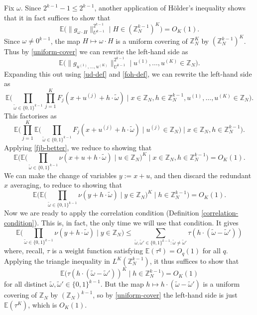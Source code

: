 \documentclass[12pt,a4paper,reqno]{amsart}
\numberwithin{equation}{section}
\theoremstyle{plain}
\theoremstyle{definition}
\renewcommand{\leq}{\leqslant}
\def\Z{{\mathbb Z}}
\def\E{{\mathbb E}}
\def\ni{\noindent}
\def\endproof{\hfill{\usebox{\proofbox}}}
\begin{document}
\ni Fix $\omega$.  Since $2^{k-1}-1 \leq 2^{k-1}$, another application of H\"older's inequality shows that it in fact suffices
to show that
$$\E\big( \| g_{\omega \cdot H} \|_{U^{k-1}}^{2^{k-1}} \; \big| \; H \in (\mathbb{Z}_N^{k-1})^K \big) = O_K(1).$$
Since $\omega \neq 0^{k-1}$, the map $H \mapsto \omega \cdot H$ is a uniform covering of $\mathbb{Z}_N^K$ 
by $(\mathbb{Z}_N^{k-1})^K$.  Thus by \eqref{uniform-cover} we can rewrite the left-hand side as
$$\E\big( \| g_{u^{(1)}, \ldots, u^{(K)}} \|_{U^{k-1}}^{2^{k-1}} \; \big| \; u^{(1)}, \ldots, u^{(K)} \in \mathbb{Z}_N \big).$$
Expanding this out using \eqref{ud-def} and \eqref{foh-def}, we can rewrite the left-hand side as
$$\E\bigg( \prod_{\tilde \omega \in \{0,1\}^{k-1}} \prod_{j=1}^K
F_j(x + u^{(j)} + h \cdot \tilde \omega) \; \bigg| \; x \in \mathbb{Z}_N, h \in \mathbb{Z}_N^{k-1}, 
u^{(1)}, \ldots, u^{(K)} \in \mathbb{Z}_N \bigg).$$
This factorises as
$$ \E\bigg( \prod_{j=1}^K \E\big( \prod_{\tilde \omega \in \{0,1\}^{k-1}} 
F_j(x + u^{(j)} + h \cdot \tilde \omega) \; \big| \; u^{(j)} \in \mathbb{Z}_N \big) \; \bigg| \;
x \in \mathbb{Z}_N, h \in \mathbb{Z}_N^{k-1} \bigg).$$
Applying \eqref{fjb-better}, we reduce to showing that
$$ \E\bigg( \E\big( \prod_{\tilde \omega \in \{0,1\}^{k-1}} 
\nu(x + u + h \cdot \tilde \omega)\; \big| \; u \in \mathbb{Z}_N \big)^K \; \bigg| \;
x \in \mathbb{Z}_N, h \in \mathbb{Z}_N^{k-1} \bigg) = O_K(1).$$
We can make the change of variables $y := x+u$, and then discard the redundant $x$ averaging, to reduce to showing that
$$ \E\bigg( \E\big( \prod_{\tilde \omega \in \{0,1\}^{k-1}} 
\nu(y + h \cdot \tilde \omega) \; \big| \; y \in \mathbb{Z}_N \big)^K \; \bigg| \;
h \in \mathbb{Z}_N^{k-1} \bigg) = O_K(1).$$
Now we are ready to apply the correlation condition (Definition \ref{correlation-condition}). This is, in fact, the only time we will use that condition. It gives
\[ \E\bigg( \prod_{\tilde \omega \in \{0,1\}^{k-1}} \nu(y + h \cdot \tilde \omega) \; \bigg| \; y \in \mathbb{Z}_N\bigg) \leq \sum_{\tilde \omega, \tilde \omega' \in \{0,1\}^{k-1}: \tilde \omega \neq \tilde \omega'}
\tau(h \cdot (\tilde \omega - \tilde \omega'))\] where, recall, $\tau$ is a weight function satisfying $\mathbb{E}(\tau^q) = O_q(1)$ for all $q$. Applying the triangle inequality
in $L^K(\Z_N^{k-1})$, it thus suffices to show that
\[ \E\big( \tau(h \cdot (\tilde \omega - \tilde \omega'))^K \; \big| \; h \in \mathbb{Z}_N^{k-1} \big) = O_K(1)\]
for all distinct $\tilde \omega, \tilde \omega' \in \{0,1\}^{k-1}$.  But the map $h \mapsto h \cdot (\tilde \omega - \tilde \omega')$
is a uniform covering of $\mathbb{Z}_N$ by $(\mathbb{Z}_N)^{k-1}$, so by \eqref{uniform-cover} the left-hand side is
just $\E(\tau^K) $, which is $O_K(1)$.
\endproof\vspace{11pt}
\end{document}
